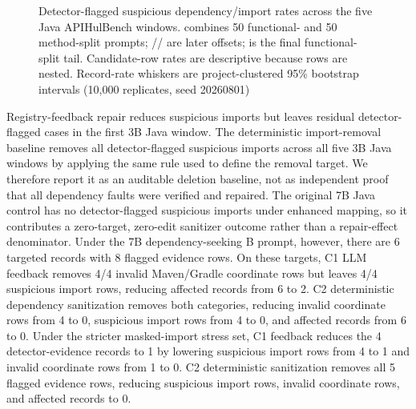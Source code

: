 \documentclass[pdflatex,sn-basic]{sn-jnl}
\newcommand{\codeid}[1]{\texttt{\detokenize{#1}}}
\begin{document}
\begin{figure}[H]
\caption{Detector-flagged suspicious dependency/import rates across the five Java APIHulBench windows. \codeid{FM50} combines 50 functional- and 50 method-split prompts; \codeid{Off50}/\codeid{Off100}/\codeid{Off150} are later offsets; \codeid{F-tail} is the final functional-split tail. Candidate-row rates are descriptive because rows are nested. Record-rate whiskers are project-clustered 95\% bootstrap intervals (10,000 replicates, seed 20260801)}
\label{fig:java-window-rates}
\end{figure}

Registry-feedback repair reduces suspicious imports but leaves residual detector-flagged cases in the first 3B Java window. The deterministic import-removal baseline removes all detector-flagged suspicious imports across all five 3B Java windows by applying the same rule used to define the removal target. We therefore report it as an auditable deletion baseline, not as independent proof that all dependency faults were verified and repaired. The original 7B Java control has no detector-flagged suspicious imports under enhanced mapping, so it contributes a zero-target, zero-edit sanitizer outcome rather than a repair-effect denominator. Under the 7B dependency-seeking B prompt, however, there are 6 targeted records with 8 flagged evidence rows. On these targets, C1 LLM feedback removes 4/4 invalid Maven/Gradle coordinate rows but leaves 4/4 suspicious import rows, reducing affected records from 6 to 2. C2 deterministic dependency sanitization removes both categories, reducing invalid coordinate rows from 4 to 0, suspicious import rows from 4 to 0, and affected records from 6 to 0. Under the stricter masked-import stress set, C1 feedback reduces the 4 detector-evidence records to 1 by lowering suspicious import rows from 4 to 1 and invalid coordinate rows from 1 to 0. C2 deterministic sanitization removes all 5 flagged evidence rows, reducing suspicious import rows, invalid coordinate rows, and affected records to 0.
\end{document}
